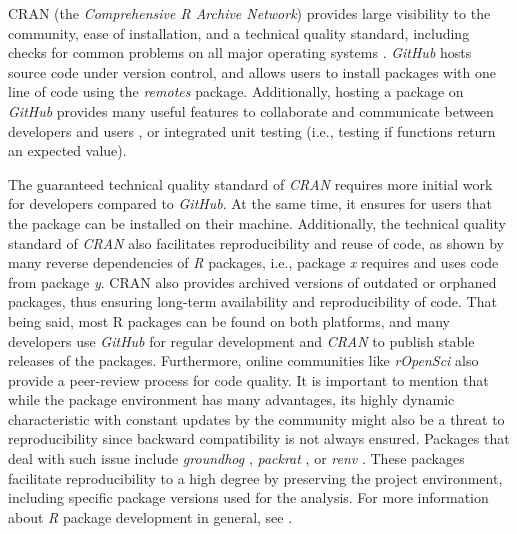 \documentclass[smallextended]{svjour3}       %
\begin{document}
CRAN (the \textit{Comprehensive R Archive Network}) provides large visibility to the community, ease of installation, and a technical quality standard, including checks for common problems on all major operating systems \cite{Wickham2015}.
\textit{GitHub} hosts source code under version control, and allows users to install packages with one line of code using the \textit{remotes} \cite{Hester2020} package.
Additionally, hosting a package on \textit{GitHub} provides many useful features to collaborate and communicate between developers and users \cite{Wickham2015}, or integrated unit testing (i.e., testing if functions return an expected value).

The guaranteed technical quality standard of \textit{CRAN} requires more initial work for developers compared to \textit{GitHub}.
At the same time, it ensures for users that the package can be installed on their machine.
Additionally, the technical quality standard of \textit{CRAN} also facilitates reproducibility and reuse of code, as shown by many reverse dependencies of \textit{R} packages, i.e., package \textit{x} requires and uses code from package \textit{y}.
CRAN also provides archived versions of outdated or orphaned packages, thus ensuring long-term availability and reproducibility of code.
That being said, most R packages can be found on both platforms, and many developers use \textit{GitHub} for regular development and \textit{CRAN} to publish stable releases of the packages.
Furthermore, online communities like \textit{rOpenSci} also provide a peer-review process for code quality.
It is important to mention that while the package environment has many advantages, its highly dynamic characteristic with constant updates by the community might also be a threat to reproducibility since backward compatibility is not always ensured.
Packages that deal with such issue include \textit{groundhog} \cite{Simonsohn2021}, \textit{packrat} \cite{Ushey2018}, or \textit{renv} \cite{Ushey2020}.
These packages facilitate reproducibility to a high degree by preserving the project environment, including specific package versions used for the analysis.
For more information about \textit{R} package development in general, see \cite{Wickham2015}.
\end{document}

